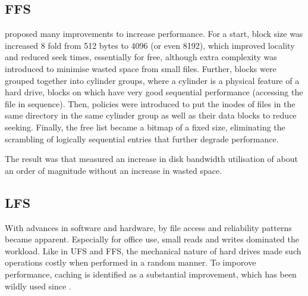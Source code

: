         \subsection{FFS}
            \label{sec_FFS}

            \citeauthor{FFS} proposed many improvements to increase
            performance.  For a start, block size was increased 8 fold from 512
            bytes to 4096 (or even 8192), which improved locality and reduced
            seek times, essentially for free, although extra complexity was
            introduced to minimise wasted space from small files. Further,
            blocks were grouped together into cylinder groups, where a cylinder
            is a physical feature of a hard drive, blocks on which have very
            good sequential performance (accessing the file in sequence). Then,
            policies were introduced to put the inodes of files in the same
            directory in the same cylinder group as well as their data blocks
            to reduce seeking. Finally, the free list became a bitmap of a
            fixed size, eliminating the scrambling of logically sequential
            entries that further degrade performance.

            The result was that \citeauthor{FFS} measured an increase in disk
            bandwidth utilisation of about an order of magnitude without an
            increase in wasted space.



        \subsection{LFS}
            \label{sec_LFS}

            With advances in software and hardware, by \citeyear{IO_bottleneck}
            file access and reliability patterns became apparent. Especially
            for office use, small reads and writes dominated the workload. Like
            in UFS and FFS, the mechanical nature of hard drives made such
            operations costly when performed in a random manner. To imporove
            performance, caching is identified as a substantial improvement,
            which has been wildly used since \cite{IO_bottleneck}
            \cite{Linux_VFS_cache}.

